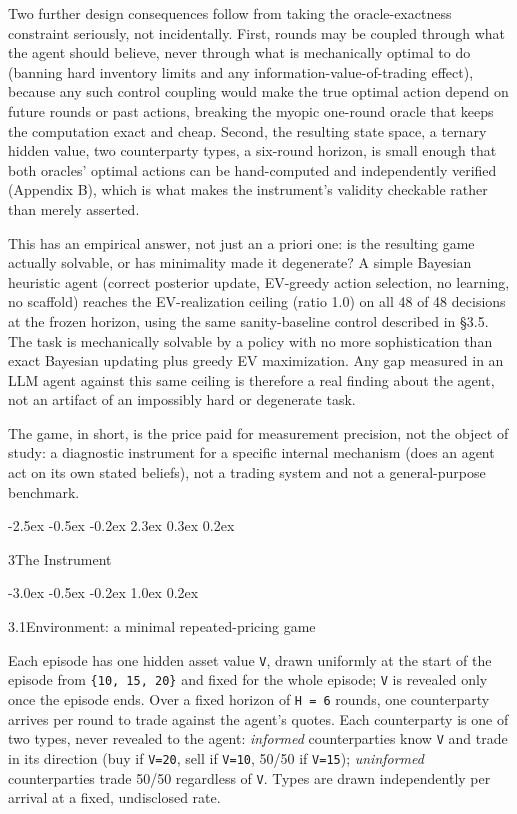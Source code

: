 \documentclass[
  11pt,
]{article}
\makeatletter
\renewcommand{\section}{%
  \@startsection{section}{1}{\z@}%
                {-2.5ex \@plus -0.5ex \@minus -0.2ex}%
                { 2.3ex \@plus  0.3ex \@minus  0.2ex}%
                {\large\bf\raggedright}%
}
\renewcommand{\subsection}{%
  \@startsection{subsection}{2}{\z@}%
                {-3.0ex \@plus -0.5ex \@minus -0.2ex}%
                { 1.0ex \@plus  0.2ex}%
                {\normalsize\bf\raggedright}%
}
\makeatother
\begin{document}
Two further design consequences follow from taking the oracle-exactness constraint seriously, not incidentally. First, rounds may be coupled through what the agent should believe, never through what is mechanically optimal to do (banning hard inventory limits and any information-value-of-trading effect), because any such control coupling would make the true optimal action depend on future rounds or past actions, breaking the myopic one-round oracle that keeps the computation exact and cheap. Second, the resulting state space, a ternary hidden value, two counterparty types, a six-round horizon, is small enough that both oracles' optimal actions can be hand-computed and independently verified (Appendix B), which is what makes the instrument's validity checkable rather than merely asserted.

This has an empirical answer, not just an a priori one: is the resulting game actually solvable, or has minimality made it degenerate? A simple Bayesian heuristic agent (correct posterior update, EV-greedy action selection, no learning, no scaffold) reaches the EV-realization ceiling (ratio 1.0) on all 48 of 48 decisions at the frozen horizon, using the same sanity-baseline control described in §3.5. The task is mechanically solvable by a policy with no more sophistication than exact Bayesian updating plus greedy EV maximization. Any gap measured in an LLM agent against this same ceiling is therefore a real finding about the agent, not an artifact of an impossibly hard or degenerate task.

The game, in short, is the price paid for measurement precision, not the object of study: a diagnostic instrument for a specific internal mechanism (does an agent act on its own stated beliefs), not a trading system and not a general-purpose benchmark.

\section{3\quad The Instrument}\label{the-instrument}

\subsection{3.1\quad Environment: a minimal repeated-pricing game}\label{environment-a-minimal-repeated-pricing-game}

Each episode has one hidden asset value \texttt{V}, drawn uniformly at the start of the episode from \texttt{\{10,\ 15,\ 20\}} and fixed for the whole episode; \texttt{V} is revealed only once the episode ends. Over a fixed horizon of \texttt{H\ =\ 6} rounds, one counterparty arrives per round to trade against the agent's quotes. Each counterparty is one of two types, never revealed to the agent: \emph{informed} counterparties know \texttt{V} and trade in its direction (buy if \texttt{V=20}, sell if \texttt{V=10}, 50/50 if \texttt{V=15}); \emph{uninformed} counterparties trade 50/50 regardless of \texttt{V}. Types are drawn independently per arrival at a fixed, undisclosed rate.
\end{document}
